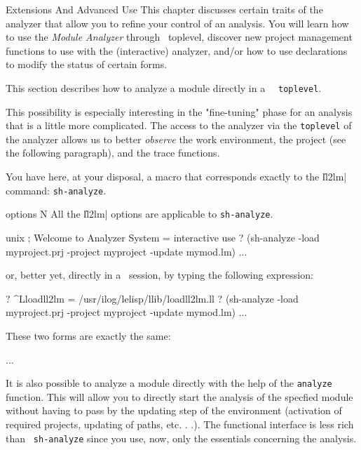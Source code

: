 {Extensions And Advanced Use}
This chapter discusses certain traits of the analyzer that allow you to
refine your control of an analysis.
You will learn how to use the {\it Module Analyzer} through \LeLisp\ toplevel, discover new project management functions to use with the (interactive) analyzer, and/or how to use declarations to modify the status of certain forms.

This section describes how to analyze a module directly in a \LeLisp\  {\tt
toplevel}.

This possibility is especially interesting in the "fine-tuning" phase for an analysis that is a little more complicated.  The access to the analyzer via the {\tt toplevel} of the analyzer allows us to better {\it observe} the work environment, the project (see the following paragraph), and the trace functions. 

You have here, at your disposal, a macro that corresponds exactly to the \|ll2lm| command: {\tt sh-analyze}. 

 {options} {N}
All the \|ll2lm| options are applicable to {\tt sh-analyze}.

\begin{Code*}
unix%
; Welcome to Analyzer System
= interactive use
? (sh-analyze -load myproject.prj -project myproject -update mymod.lm)
 ...
\end{Code*}

or, better yet, directly in a \LeLisp\ session, by typing the following expression:
\begin{Code*}
? ^Lloadll2lm
= /usr/ilog/lelisp/llib/loadll2lm.ll
? (sh-analyze -load myproject.prj -project myproject -update mymod.lm)
 ...
\end{Code*}

These two forms are exactly the same:
\begin{Code*}
 ...
\end{Code*}

It is also possible to analyze a module directly with the help of the {\tt analyze} function.  This will allow you to directly start the analysis of the specfied module without having to pass by the updating step of the environment (activation of required projects, updating of paths, etc. . .).  The functional interface is less rich than {\tt
sh-analyze} since you use, now, only the essentials concerning the analysis.

